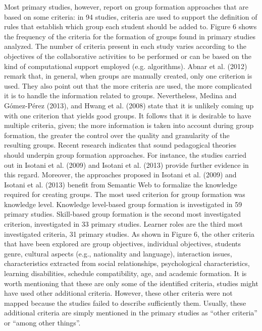 Most primary studies, however, report on group formation approaches that are based on some criteria: in 94 studies, criteria are used to support the definition of rules that establish which group each student should be added to. Figure 6 shows the frequency of the criteria for the formation of groups found in primary studies analyzed. The number of criteria present in each study varies according to the objectives of the collaborative activities to be performed or can be based on the kind of computational support employed (e.g. algorithms). Abnar et al. (2012) remark that, in general, when groups are manually created, only one criterion is used. They also point out that the more criteria are used, the more complicated it is to handle the information related to groups. Nevertheless,  Medina and Gómez-Pérez (2013), and Hwang et al. (2008) state that it is unlikely coming up with one criterion that yields good groups. It follows that it is desirable to have multiple criteria, given; the more information is taken into account during group formation, the greater the control over the quality and granularity of the resulting groups. Recent research indicates that sound pedagogical theories should underpin group formation approaches. For instance, the studies carried out in Isotani et al. (2009) and Isotani et al. (2013) provide further evidence in this regard. Moreover, the approaches proposed in Isotani et al. (2009) and Isotani et al. (2013) benefit from Semantic Web to formalize the knowledge required for creating groups. 
	The most used criterion for group formation was knowledge level. Knowledge level-based group formation is investigated in 59 primary studies. Skill-based group formation is the second most investigated criterion, investigated in 33 primary studies. Learner roles are the third most investigated criteria, 31 primary studies. As shown in Figure 6, the other criteria that have been explored are group objectives, individual objectives, students genre, cultural aspects (e.g., nationality and language), interaction issues, characteristics extracted from social relationships, psychological characteristics, learning disabilities, schedule compatibility, age, and academic formation. It is worth mentioning that these are only some of the identified criteria, studies might have used other additional criteria. However, these other criteria were not mapped because the studies failed to describe sufficiently them. Usually, these additional criteria are simply mentioned in the primary studies as “other criteria” or “among other things”.

